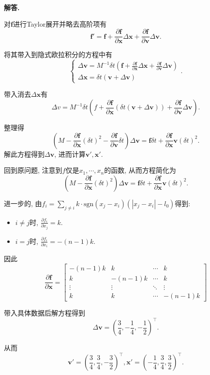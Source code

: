\documentclass[11pt]{article}
\newenvironment{solution}{\par\noindent\textbf{解答. }}{\par}
\begin{document}
\begin{solution}
\begin{enumerate}[(1)]
			对$\bm{f}$进行Taylor展开并略去高阶项有 $$\bm{f}'=\bm{f}+\frac{\partial\bm{f}}{\partial\bm{x}}\Delta\bm{x}+\frac{\partial\bm{f}}{\partial\bm{v}}\Delta\bm{v}.$$

			将其带入到隐式欧拉积分的方程中有 $$\begin{cases}
				\Delta\bm{v}= M^{-1}\delta t(\bm{f}+\frac{\partial\bm{f}}{\partial\bm{x}}\Delta\bm{x}+\frac{\partial\bm{f}}{\partial\bm{v}}\Delta\bm{v}) \\
				\Delta\bm{x}=\delta t(\bm{v}+\Delta\bm{v})
			\end{cases}.$$

			带入消去$\Delta\bm{x}$有 $$\Delta v=M^{-1}\delta t(f+\frac{\partial\bm{f}}{\partial\bm{x}}(\delta t(\bm{v}+\Delta\bm{v}))+\frac{\partial\bm{f}}{\partial\bm{v}}\Delta\bm{v}).$$

			整理得 $$\left(M-\frac{\partial\bm{f}}{\partial\bm{x}}(\delta t)^2-\frac{\partial\bm{f}}{\partial\bm{v}}\delta t\right)\Delta\bm{v}=\bm{f}\delta t+\frac{\partial\bm{f}}{\partial\bm{x}}\bm{v}(\delta t)^2.$$ 解此方程得到$\Delta\bm{v}$, 进而计算$\bm{v}',\bm{x}'$.

			回到原问题, 注意到$f$仅是$x_1,\cdots,x_n$的函数, 从而方程简化为 $$\left(M-\frac{\partial\bm{f}}{\partial\bm{x}}(\delta t)^2\right)\Delta\bm{v}=\bm{f}\delta t+\frac{\partial\bm{f}}{\partial\bm{x}}\bm{v}(\delta t)^2.$$

			进一步的, 由$f_i=\sum\limits_{j\neq i}k\cdot\mathrm{sgn}(x_j-x_i)(|x_j-x_i|-l_0)$得到:
			\begin{itemize}
				\item $i\neq j$时, $\frac{\partial f_i}{\partial x_j}=k$.
				\item $i=j$时, $\frac{\partial f_i}{\partial x_i}=-(n-1)k$.
			\end{itemize}
			因此 $$\frac{\partial\bm{f}}{\partial\bm{x}}=\begin{bmatrix}
				-(n-1)k & k & \cdots & k \\
				k & -(n-1)k & \cdots & k \\
				\vdots & \vdots & \ddots & \vdots \\
				k & k & \cdots & -(n-1)k
			\end{bmatrix}$$

			带入具体数据后解方程得到 $$\Delta\bm{v}=\left(\frac{3}{4},-\frac{1}{4},-\frac{1}{2}\right)^\top. $$

			从而 $$\bm{v}'=\left(\frac{3}{4},\frac{3}{4},-\frac{3}{2}\right)^\top,\bm{x}'=\left(-\frac{1}{4},\frac{3}{4},\frac{3}{2}\right)^\top.$$
		\end{enumerate}
	\end{solution}
\end{document}
